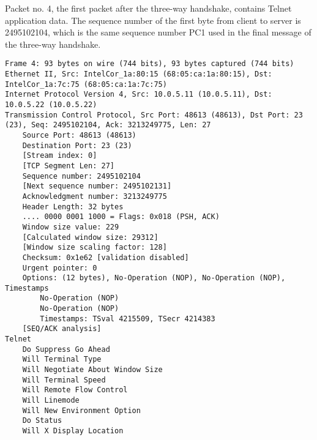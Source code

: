Packet no. 4, the first packet after the three-way handshake, contains Telnet application data. The sequence number of the first byte from client to server is 2495102104, which is the same sequence number PC1 used in the final message of the three-way handshake.

\begin{lstlisting}
Frame 4: 93 bytes on wire (744 bits), 93 bytes captured (744 bits)
Ethernet II, Src: IntelCor_1a:80:15 (68:05:ca:1a:80:15), Dst: IntelCor_1a:7c:75 (68:05:ca:1a:7c:75)
Internet Protocol Version 4, Src: 10.0.5.11 (10.0.5.11), Dst: 10.0.5.22 (10.0.5.22)
Transmission Control Protocol, Src Port: 48613 (48613), Dst Port: 23 (23), Seq: 2495102104, Ack: 3213249775, Len: 27
    Source Port: 48613 (48613)
    Destination Port: 23 (23)
    [Stream index: 0]
    [TCP Segment Len: 27]
    Sequence number: 2495102104
    [Next sequence number: 2495102131]
    Acknowledgment number: 3213249775
    Header Length: 32 bytes
    .... 0000 0001 1000 = Flags: 0x018 (PSH, ACK)
    Window size value: 229
    [Calculated window size: 29312]
    [Window size scaling factor: 128]
    Checksum: 0x1e62 [validation disabled]
    Urgent pointer: 0
    Options: (12 bytes), No-Operation (NOP), No-Operation (NOP), Timestamps
        No-Operation (NOP)
        No-Operation (NOP)
        Timestamps: TSval 4215509, TSecr 4214383
    [SEQ/ACK analysis]
Telnet
    Do Suppress Go Ahead
    Will Terminal Type
    Will Negotiate About Window Size
    Will Terminal Speed
    Will Remote Flow Control
    Will Linemode
    Will New Environment Option
    Do Status
    Will X Display Location
\end{lstlisting}